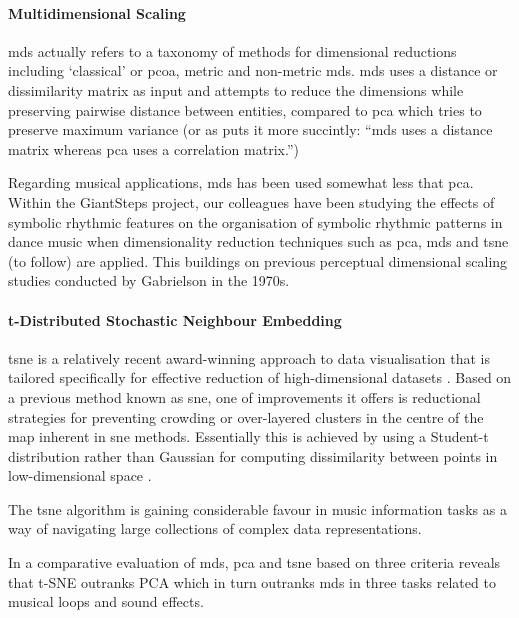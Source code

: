 \paragraph{Multidimensional Scaling}

\acrfull{mds} actually refers to a taxonomy of methods for dimensional reductions including `classical' or \acrfull{pcoa}, metric and non-metric \acrshort{mds}. \acrshort{mds} uses a distance or dissimilarity matrix as input and attempts to reduce the dimensions while preserving pairwise distance between entities, compared to \acrshort{pca} which tries to preserve maximum variance (or as \cite{frisson2015} puts it more succintly: ``\acrshort{mds} uses a distance matrix whereas \acrshort{pca} uses a correlation matrix.'')

Regarding musical applications, \acrshort{mds} has been used somewhat less that \acrshort{pca}. Within the GiantSteps project, our colleagues have been studying the effects of symbolic rhythmic features on the organisation of symbolic rhythmic patterns in dance music when dimensionality reduction techniques such as \acrshort{pca}, \acrshort{mds} and \acrshort{tsne} (to follow) are applied. This buildings on previous perceptual dimensional scaling studies conducted by Gabrielson in the 1970s. 

\paragraph{t-Distributed Stochastic Neighbour Embedding}

\acrfull{tsne} is a relatively recent award-winning approach to data visualisation that is tailored specifically for effective reduction of high-dimensional datasets \citep{VanDerMaaten2008}. Based on a previous method known as \acrfull{sne}, one of improvements it offers is  reductional strategies for preventing crowding or over-layered clusters in the centre of the map inherent in \acrshort{sne} methods. Essentially this is achieved by using a Student-t distribution rather than Gaussian for computing dissimilarity between points in low-dimensional space \citep{VanDerMaaten2008}	.

The \acrshort{tsne} algorithm is gaining considerable favour in music information tasks as a way of navigating large collections of complex data representations. 

In a comparative evaluation of \acrshort{mds}, \acrshort{pca} and \acrshort{tsne} based on three criteria \citep{Dupont2013} reveals that t-SNE outranks PCA which in turn outranks \acrshort{mds} in three tasks related to musical loops and sound effects.

